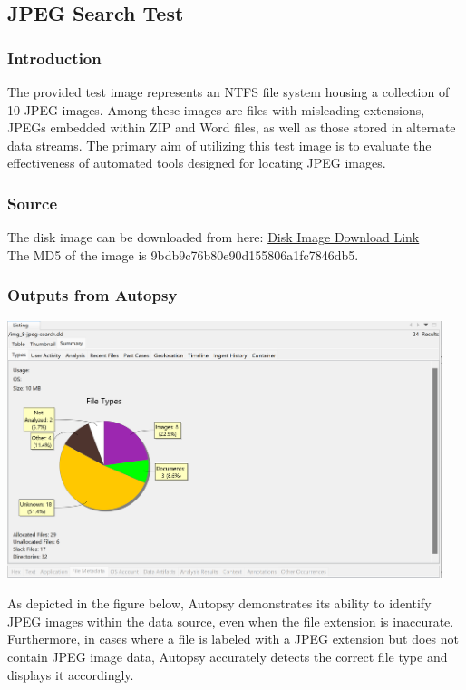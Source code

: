 \documentclass{article}
\begin{document}
\subsection{JPEG Search Test}
\subsubsection*{Introduction}
The provided test image represents an NTFS file system housing a collection of 10 JPEG images. Among these images are files with misleading extensions, JPEGs embedded within ZIP and Word files, as well as those stored in alternate data streams. The primary aim of utilizing this test image is to evaluate the effectiveness of automated tools designed for locating JPEG images.
\subsubsection*{Source}
The disk image can be downloaded from here: \href{http://prdownloads.sourceforge.net/dftt/8-jpeg-search.zip?download}{Disk Image Download Link} \\
The MD5 of the image is 9bdb9c76b80e90d155806a1fc7846db5.

\subsubsection*{Outputs from Autopsy}
\begin{center}
    \includegraphics[width=0.95\textwidth]{6/6.4/Autopsy JPEG Search Summary.png}
\end{center}
As depicted in the figure below, Autopsy demonstrates its ability to identify JPEG images within the data source, even when the file extension is inaccurate. Furthermore, in cases where a file is labeled with a JPEG extension but does not contain JPEG image data, Autopsy accurately detects the correct file type and displays it accordingly.
\end{document}
